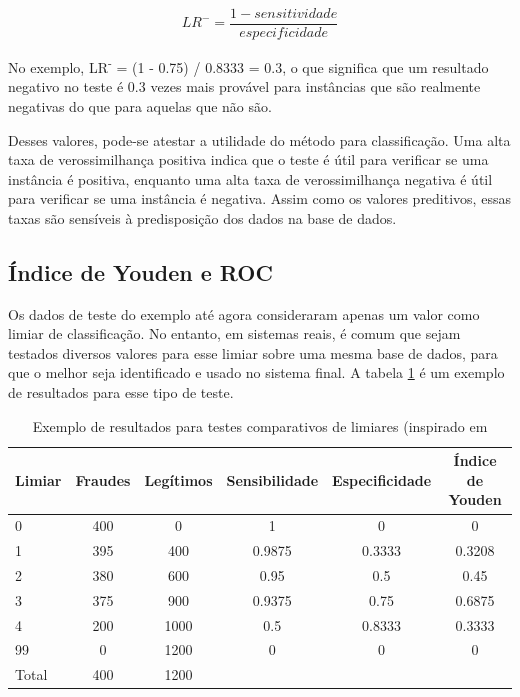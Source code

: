 \vspace{2mm}
\begin{equation}
    LR^{-}=\frac{1 - sensitividade}{especificidade}
\end{equation}
\vspace{2mm}

No exemplo, LR\textsuperscript{-} = (1 - 0.75) / 0.8333 = 0.3, o que significa que um resultado negativo no teste é 0.3 vezes mais provável para instâncias que são realmente negativas do que para aquelas que não são.

Desses valores, pode-se atestar a utilidade do método para classificação. Uma alta taxa de verossimilhança positiva indica que o teste é útil para verificar se uma instância é positiva, enquanto uma alta taxa de verossimilhança negativa é útil para verificar se uma instância é negativa. Assim como os valores preditivos, essas taxas são sensíveis à predisposição dos dados na base de dados.

\subsection{Índice de Youden e ROC}

Os dados de teste do exemplo até agora consideraram apenas um valor como limiar de classificação. No entanto, em sistemas reais, é comum que sejam testados diversos valores para esse limiar sobre uma mesma base de dados, para que o melhor seja identificado e usado no sistema final. A tabela \ref{fraud:youden} é um exemplo de resultados para esse tipo de teste.

\vspace{2mm}
\begin{table}[h!]
    \centering
    \begin{tabular}{l c c c c c}
        \hline
        Limiar & Fraudes & Legítimos & Sensibilidade & Especificidade & Índice de Youden \\
        \hline
        0     & 400 &    0 & 1      & 0      & 0      \\
        1     & 395 &  400 & 0.9875 & 0.3333 & 0.3208  \\
        2     & 380 &  600 & 0.95   & 0.5    & 0.45   \\
        3     & 375 &  900 & 0.9375 & 0.75   & 0.6875 \\
        4     & 200 & 1000 & 0.5    & 0.8333 & 0.3333 \\
        99    &   0 & 1200 & 0      & 0      & 0      \\
        \hline
        Total & 400 & 1200 &        &        &        \\
        \hline
    \end{tabular}
    \caption{Exemplo de resultados para testes comparativos de limiares (inspirado em \citet{Bewick2004}}
    \label{fraud:youden}
\end{table}
\vspace{2mm}

